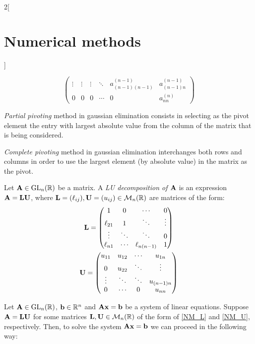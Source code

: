 \documentclass[../../../main.tex]{subfiles}
\begin{document}
\begin{multicols}{2}[\section{Numerical methods}]
\begin{method}
$$\begin{pmatrix}
        \vdots & \vdots & \vdots & \ddots & a_{(n-1)(n-1)}^{(n-1)} & a_{(n-1)n}^{(n-1)}\\
        0& 0 & 0 & \cdots &  0 & a_{nn}^{(n)}
    \end{pmatrix}
    $$
\end{method}
\begin{method}
    \textit{Partial pivoting} method in gaussian elimination consists in selecting as the pivot element the entry with largest absolute value from the column of the matrix that is being considered. 
\end{method}
\begin{method}
    \textit{Complete pivoting} method in gaussian elimination interchanges both rows and columns in order to use the largest element (by absolute value) in the matrix as the pivot.
\end{method}
\begin{definition}[LU descompostion]
    Let $\vb{A}\in\mathrm{GL}_n(\mathbb{R})$ be a matrix. A \textit{LU decomposition of $\vb{A}$} is an expression $\vb{A}=\vb{L}\vb{U}$, where $\vb{L}=(\ell_{ij}),\vb{U}=(u_{ij})\in\mathcal{M}_n(\mathbb{R})$ are matrices of the form:
    \begin{gather}\label{NM_L}
        \vb{L}=
        \begin{pmatrix}
            1 & 0 & \cdots & 0\\
            \ell_{21} & 1 & \ddots & \vdots \\
            \vdots & \ddots & \ddots & 0\\
            \ell_{n1} & \cdots & \ell_{n(n-1)} & 1
        \end{pmatrix}\\\label{NM_U}
        \vb{U}=
        \begin{pmatrix}
            u_{11} & u_{12} & \cdots & u_{1n}\\
            0 & u_{22} & \ddots & \vdots \\
            \vdots & \ddots & \ddots & u_{(n-1)n}\\
            0 & \cdots & 0 & u_{nn}
        \end{pmatrix}
    \end{gather}
\end{definition}
\begin{lemma}
    Let $\vb{A}\in\mathrm{GL}_n(\mathbb{R})$, $\vb{b}\in\mathbb{R}^n$ and $\vb{A}\vb{x}=\vb{b}$ be a system of linear equations. Suppose $\vb{A}=\vb{L}\vb{U}$ for some matrices $\vb{L},\vb{U}\in\mathcal{M}_n(\mathbb{R})$ of the form of \eqref{NM_L} and \eqref{NM_U}, respectively. Then, to solve the system $\vb{A}\vb{x}=\vb{b}$ we can proceed in the following way:

\end{lemma}
\end{multicols}
\end{document}
